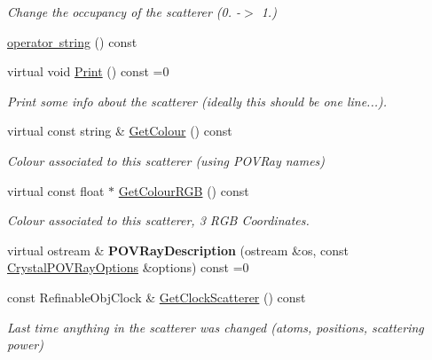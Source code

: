 \begin{DoxyCompactItemize}
\begin{DoxyCompactList}\small\item\em Change the occupancy of the scatterer (0. -\/$>$ 1.) \end{DoxyCompactList}\item 
\mbox{\hyperlink{class_obj_cryst_1_1_scatterer_a08809f1466046daf570fc5342b975f40}{operator string}} () const
\item 
\mbox{\label{class_obj_cryst_1_1_scatterer_a0d865e9598c10ce4db5ff8885ecbc0a9}} 
virtual void \mbox{\hyperlink{class_obj_cryst_1_1_scatterer_a0d865e9598c10ce4db5ff8885ecbc0a9}{Print}} () const =0
\begin{DoxyCompactList}\small\item\em Print some info about the scatterer (ideally this should be one line...). \end{DoxyCompactList}\item 
virtual const string \& \mbox{\hyperlink{class_obj_cryst_1_1_scatterer_ac0d7457431eacb14d31bee72c6f0af7a}{Get\+Colour}} () const
\begin{DoxyCompactList}\small\item\em Colour associated to this scatterer (using P\+O\+V\+Ray names) \end{DoxyCompactList}\item 
virtual const float $\ast$ \mbox{\hyperlink{class_obj_cryst_1_1_scatterer_a4e7e5107e4557084f8cf7efb6489fee2}{Get\+Colour\+R\+GB}} () const
\begin{DoxyCompactList}\small\item\em Colour associated to this scatterer, 3 R\+GB Coordinates. \end{DoxyCompactList}\item 
\mbox{\label{class_obj_cryst_1_1_scatterer_a708cc857f82c9af4cbdf4d9334449d0f}} 
virtual ostream \& {\bfseries P\+O\+V\+Ray\+Description} (ostream \&os, const \mbox{\hyperlink{struct_obj_cryst_1_1_crystal_p_o_v_ray_options}{Crystal\+P\+O\+V\+Ray\+Options}} \&options) const =0
\item 
\mbox{\label{class_obj_cryst_1_1_scatterer_aa80ea62ee58a9c6e12cb2863d641b3d3}} 
const Refinable\+Obj\+Clock \& \mbox{\hyperlink{class_obj_cryst_1_1_scatterer_aa80ea62ee58a9c6e12cb2863d641b3d3}{Get\+Clock\+Scatterer}} () const
\begin{DoxyCompactList}\small\item\em Last time anything in the scatterer was changed (atoms, positions, scattering power) \end{DoxyCompactList}\item 

\end{DoxyCompactItemize}
